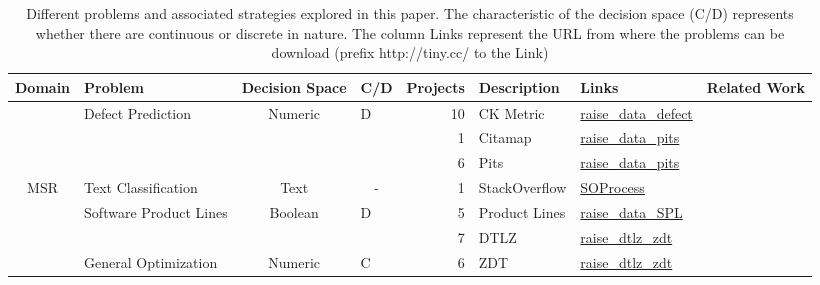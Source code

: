 \documentclass[table, xcdraw, sigconf,review, anonymous]{acmart}
\begin{document}
\cite{mathew2017shorter}

\begin{table}[]
\centering
\caption{Different problems and associated strategies explored in this paper. The characteristic of the decision space (C/D) represents whether there are continuous or discrete in nature. The column Links represent the URL from where the problems can be download (prefix http://tiny.cc/ to the Link)}
\label{tbl:only1}
\begin{tabular}{@{}cp{3cm}cp{0.7cm}rp{3cm}lr@{}}
\toprule
\textbf{Domain} & \textbf{Problem} & \textbf{Decision Space} & \textbf{C/D} & \textbf{Projects} & \textbf{Description} & \textbf{Links} & \textbf{Related Work} \\ \midrule
 & Defect Prediction & Numeric & D & 10 & CK Metric & \href{http://tiny.cc/raise_data_defect}{raise\_data\_defect} & \cite{fu2016tuning} \\
 & \cellcolor[HTML]{EFEFEF} & \cellcolor[HTML]{EFEFEF} & \multicolumn{1}{c}{\cellcolor[HTML]{EFEFEF}} & \cellcolor[HTML]{EFEFEF}1 & \cellcolor[HTML]{EFEFEF}Citamap & \cellcolor[HTML]{EFEFEF}\href{http://tiny.cc/raise_data_pits}{raise\_data\_pits} & \cellcolor[HTML]{EFEFEF} \\
 & \cellcolor[HTML]{EFEFEF} & \cellcolor[HTML]{EFEFEF} & \multicolumn{1}{c}{\cellcolor[HTML]{EFEFEF}} & \cellcolor[HTML]{EFEFEF}6 & \cellcolor[HTML]{EFEFEF}Pits & \cellcolor[HTML]{EFEFEF}\href{http://tiny.cc/raise_data_pits}{raise\_data\_pits} & \cellcolor[HTML]{EFEFEF} \\
\multirow{-4}{*}{MSR} & \multirow{-3}{*}{\cellcolor[HTML]{EFEFEF}Text Classification} & \multirow{-3}{*}{\cellcolor[HTML]{EFEFEF}Text} & \multicolumn{1}{c}{\multirow{-3}{*}{\cellcolor[HTML]{EFEFEF}-}} & \cellcolor[HTML]{EFEFEF}1 & \cellcolor[HTML]{EFEFEF}StackOverflow & \cellcolor[HTML]{EFEFEF}\href{http://tiny.cc/SOProcess}{SOProcess} & \multirow{-3}{*}{\cellcolor[HTML]{EFEFEF}\cite{agrawalwrong}} \\ \midrule
 & Software Product Lines & Boolean & D & 5 & Product Lines & \href{http://tiny.cc/raise_data_SPL}{raise\_data\_SPL} & \cite{chen2017sampling} \\
 & \cellcolor[HTML]{EFEFEF} & \cellcolor[HTML]{EFEFEF} & \cellcolor[HTML]{EFEFEF} & \cellcolor[HTML]{EFEFEF}7 & \cellcolor[HTML]{EFEFEF}DTLZ & \cellcolor[HTML]{EFEFEF}\href{http://tiny.cc/raise_dtlz_zdt}{raise\_dtlz\_zdt} & \cellcolor[HTML]{EFEFEF} \\
 & \multirow{-2}{*}{\cellcolor[HTML]{EFEFEF}General Optimization} & \multirow{-2}{*}{\cellcolor[HTML]{EFEFEF}Numeric} & \multirow{-2}{*}{\cellcolor[HTML]{EFEFEF}C} & \cellcolor[HTML]{EFEFEF}6 & \cellcolor[HTML]{EFEFEF}ZDT & \cellcolor[HTML]{EFEFEF}\href{http://tiny.cc/raise_dtlz_zdt}{raise\_dtlz\_zdt} & \multirow{-2}{*}{\cellcolor[HTML]{EFEFEF}\cite{nair2016accidental}} \\

\end{tabular}
\end{table}
\end{document}
